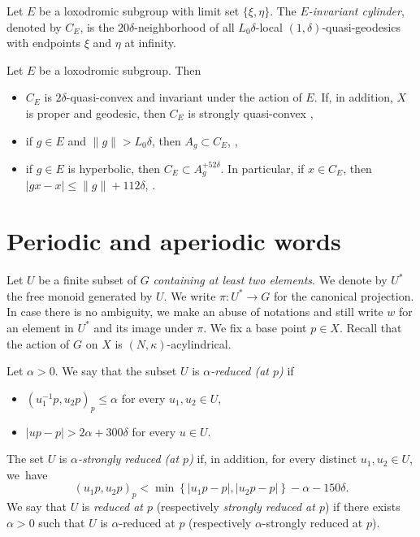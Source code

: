 \begin{df} Let $E$ be a loxodromic subgroup with limit set $\{ \xi,\eta \}$. The \emph{$E$-invariant cylinder}, denoted by $C_E$, is the $20\delta$-neighborhood of all $L_0 \delta$-local $(1, \delta)$-quasi-geodesics with endpoints $\xi$ and $\eta$ at infinity.
\end{df}

\begin{lem}\label{L: invariant cylinder}
Let $E$ be a loxodromic subgroup. Then
\begin{itemize}
\item $C_E$ is $2\delta$-quasi-convex and invariant under the action of $E$. If, in addition, $X$ is proper and geodesic, then $C_E$ is strongly quasi-convex \cite[Lem.\,2.31]{coulon_geometry_2014},

\item if $g\in E$ and $\| g \|>L_0\delta$, then $A_g\subset C_E$, \cite[Lem.\,2.33]{coulon_geometry_2014},

\item if $g\in E$ is hyperbolic, then $C_E\subset A_g^{+ 52\delta}$. In particular, if $x\in C_E$, then $|gx-x|\leqslant \| g \| + 112 \delta $, \cite[Lem.\,2.32]{coulon_geometry_2014}.

\end{itemize}
\end{lem}

\section{Periodic and aperiodic words}
\label{sec: periodic and aperiodic words}
Let $U$ be a finite subset of $G$ \emph{containing at least two elements}.
We denote by $U^*$ the free monoid generated by $U$.
We write $\pi \colon U^* \to G$ for the canonical projection.
In case there is no ambiguity, we make an abuse of notations and still write $w$ for an element in $U^*$ and its image under $\pi$.
We fix a base point $p \in X$.
Recall that the action of $G$ on $X$ is $(N,\kappa)$-acylindrical.

\begin{df}
\label{def: reduced set}
Let $\alpha > 0$.
We say that the subset $U$ is \emph{$\alpha$-reduced (at $p$)} if
\begin{itemize}
\item $(u_1^{-1}p, u_2p)_p \leqslant \alpha$ for every $u_1, u_2 \in U$,
\item $|up - p| > 2\alpha + 300\delta$ for every $u \in U$.
\end{itemize}
The set $U$ is \emph{$\alpha$-strongly reduced (at $p$)} if, in addition, for every distinct $u_1, u_2 \in U$, we~have
\begin{equation*}
(u_1p,u_2p)_p < \min \left\{ |u_1p - p|, |u_2p - p|\right\} -\alpha - 150\delta.
\end{equation*}
We say that $U$ is \emph{reduced at $p$} (respectively \emph{strongly reduced at $p$}) if there exists $\alpha > 0$ such that $U$ is $\alpha$-reduced at $p$ (respectively $\alpha$-strongly reduced at $p$).
\end{df}

